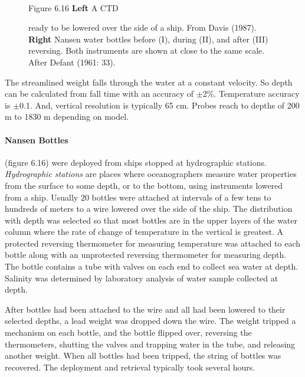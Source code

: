 \begin{figure}[t!]
\ \ \ \ \ \ \\
\footnotesize
Figure 6.16 \textbf{Left} A CTD \rule{0mm}{4ex}ready to be
lowered over the side of a ship. From Davis (1987). \textbf{Right}
Nansen water bottles before (I), during (II), and after (III)
reversing. Both instruments are shown at close to the same
scale. After Defant (1961: 33).
\label{fig:ctdnansen}
\vspace{-3ex}
\end{figure}

The streamlined weight falls through the water at a constant
velocity. So depth can be calculated from fall time with an
accuracy of $\pm$2\%.  Temperature
accuracy is $\pm$0.1.  And,
vertical resolution is typically 65 cm. Probes reach to depths of 200
m to 1830 m depending on model.

\paragraph{Nansen Bottles} (figure 6.16) were deployed from ships
stopped at hydrographic stations.    \textit{Hydrographic stations}
are places where oceanographers
measure water properties from the surface to some depth, or to the
bottom, using instruments lowered from a ship. Usually 20 bottles were
attached at intervals of a few tens to hundreds of meters to a wire
lowered over the side of the ship. The distribution with depth was
selected so that most bottles are in the upper layers of the water
column where the rate of change of temperature in the vertical is
greatest. A protected reversing
thermometer for measuring temperature was
attached to each bottle along with an unprotected reversing
thermometer for measuring depth. The
bottle contains a tube with valves on each end to collect sea water at
depth. Salinity was determined by laboratory analysis of water sample
collected at depth.

After bottles had been attached to the wire and all had been lowered
to their selected depths, a lead weight was dropped down the wire. The
weight tripped a mechanism on each bottle, and the bottle flipped
over, reversing the thermometers,
shutting the valves and trapping water in the tube, and releasing
another weight. When all bottles had been tripped, the string of
bottles was recovered. The deployment and retrieval typically took
several hours.

